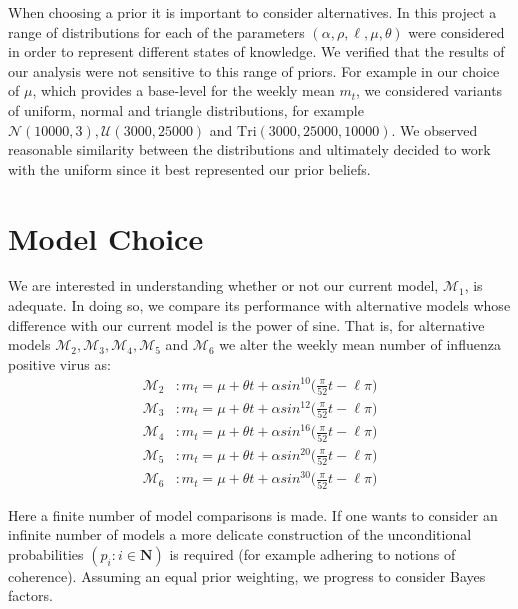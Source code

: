 \documentclass{article}
\begin{document}
When choosing a prior it is important to consider alternatives. In this project a range of distributions for each of the parameters $(\alpha, \rho, \ell, \mu, \theta)$ were considered in order to represent different states of knowledge. We verified that the results of our analysis were not sensitive to this range of priors. For example in our choice of $\mu$, which provides a base-level for the weekly mean $m_{t}$, we considered variants of uniform, normal and triangle distributions, for example $\mathcal{N}(10000,3),\mathcal{U}(3000,25000)$ and $\text{Tri}(3000,25000,10000)$. We observed reasonable similarity between the distributions and ultimately decided to work with the uniform since it best represented our prior beliefs. 

\section{Model Choice}

We are interested in understanding whether or not our current model, $\mathcal{M}_{1}$,  is adequate. In doing so, we compare its performance with alternative models whose difference with our current model is the power of sine. That is, for alternative models $\mathcal{M}_{2}, \mathcal{M}_{3}, \mathcal{M}_{4}, \mathcal{M}_{5}$ and $\mathcal{M}_{6}$ we alter the weekly mean number of influenza positive virus as:
\begin{align*}
 \mathcal{M}_{2} &:  m_{t} = \mu + \theta t + \alpha sin^{10}\Big(\frac{\pi}{52}t - \ell\pi\Big) \\
 \mathcal{M}_{3} &:  m_{t} = \mu + \theta t + \alpha sin^{12}\Big(\frac{\pi}{52}t - \ell\pi\Big) \\ 
 \mathcal{M}_{4} &:  m_{t} = \mu + \theta t + \alpha sin^{16}\Big(\frac{\pi}{52}t - \ell\pi\Big) \\
 \mathcal{M}_{5} &:  m_{t} = \mu + \theta t + \alpha sin^{20}\Big(\frac{\pi}{52}t - \ell\pi\Big) \\ 
 \mathcal{M}_{6} &:  m_{t} = \mu + \theta t + \alpha sin^{30}\Big(\frac{\pi}{52}t - \ell\pi\Big)  
\end{align*}

Here a finite number of model comparisons is made. If one wants to consider an infinite number of models a more delicate construction of the unconditional probabilities $(p_{i} : i \in \mathbf{N})$ is required (for example adhering to notions of coherence). Assuming an equal prior weighting, we progress to consider Bayes factors. 
\end{document}
